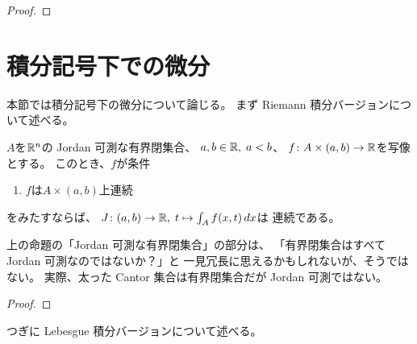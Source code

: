 \documentclass[report]{jlreq}
\begin{document}
\begin{proof}
    \TODO{}
\end{proof}

%
\section{積分記号下での微分}

本節では積分記号下の微分について論じる。
まず Riemann 積分バージョンについて述べる。

\begin{theorem}
    $A$を$\mathbb{R}^n$の Jordan 可測な有界閉集合、
    $a, b \in \mathbb{R}, \; a < b$、
    $f \colon A \times (a, b) \to \mathbb{R}$を写像とする。
    このとき、$f$が条件
    \begin{enumerate}[label=(A-\arabic*)]
        \item $f$は$A \times (a, b)$上連続
    \end{enumerate}
    をみたすならば、
    $J \colon (a, b) \to \mathbb{R}, \; t \mapsto \int_A f(x, t) \, dx$は
    連続である。

    \TODO{}
\end{theorem}

\begin{remark}
    上の命題の「Jordan 可測な有界閉集合」の部分は、
    「有界閉集合はすべて Jordan 可測なのではないか？」と
    一見冗長に思えるかもしれないが、そうではない。
    実際、太った Cantor 集合は有界閉集合だが Jordan 可測ではない。
\end{remark}

\begin{proof}
    \TODO{}
\end{proof}

つぎに Lebesgue 積分バージョンについて述べる。
\end{document}
